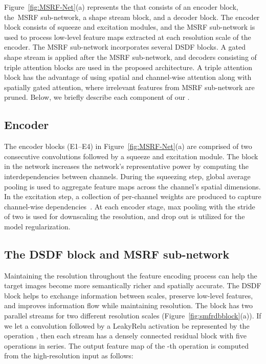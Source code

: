 \documentclass[journal,twoside,web]{IEEEtran}
\newcommand{\sysname}{\text{MSRF-Net}\xspace}
\begin{document}
Figure~\ref{fig:MSRF-Net}(a) represents the \sysname that consists of an encoder block, the~\ac{MSRF} sub-network, a shape stream block, and a decoder block. The encoder block consists of squeeze and excitation modules, and the \ac{MSRF} sub-network is used to process low-level feature maps extracted at each resolution scale of the encoder. The MSRF sub-network incorporates several \ac{DSDF} blocks. A gated shape stream is applied after the \ac{MSRF} sub-network, and decoders consisting of triple attention blocks are used in the proposed architecture. A triple attention block has the advantage of using spatial and channel-wise attention along with spatially gated attention, where irrelevant features from \ac{MSRF} sub-network are pruned. Below, we briefly describe each component of our \sysname. 
\subsection{Encoder}
The encoder blocks (E1--E4) in Figure~\ref{fig:MSRF-Net}(a) are comprised of two consecutive convolutions followed by a squeeze and excitation module. The  block in the network increases the network's representative power by computing the interdependencies between channels. During the squeezing step, global average pooling is used to aggregate feature maps across the channel's spatial dimensions. In the excitation step, a collection of per-channel weights are produced to capture channel-wise dependencies~\cite{hu2018squeeze}. At each encoder stage, max pooling with the stride of two is used for downscaling the resolution, and drop out is utilized for the model regularization.  

\subsection{The \ac{DSDF} block and MSRF sub-network}{\label{sec:DSDF}}


Maintaining the resolution throughout the feature encoding process can help the target images become more semantically richer and spatially accurate. The \ac{DSDF} block helps to exchange information between scales, preserve low-level features, and improves information flow while maintaining resolution. The block has two parallel streams for two different resolution scales (Figure~\ref{fig:smfrdbblock}(a)). If we let a  convolution followed by a LeakyRelu activation be represented by the operation ,  then each stream has a densely connected residual block with five  operations in series. The output feature map  of the -th  operation is computed from the high-resolution input  as follows:
\end{document}
